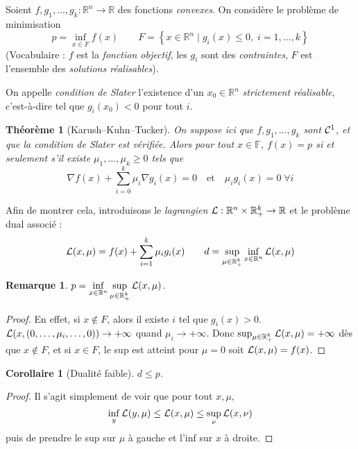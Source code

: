 \documentclass[a4paper, 11pt]{article}
\def\F{\mathbb{F}}
\def\R{\mathbb{R}}
\def\L{{\cal{L}}}
\def\Cf{{\cal{C}}}
\newtheorem*{theorem}{Théorème}
\newtheorem*{remark}{Remarque}
\newtheorem*{corollary}{Corollaire}
\begin{document}
Soient $f,g_1,\ldots,g_k : \R^n \to \R$ des fonctions \emph{convexes}.
On considère le problème de minimisation
\[ p = \inf_{x \in F} f(x) \qquad F = \left\{ x \in \R^n \mid
  g_i(x) \leq 0,\; i = 1,\ldots,k \right\} \]
(Vocabulaire : $f$ est la \emph{fonction objectif}, les $g_i$ sont des
\emph{contraintes}, $F$ est l'ensemble des \emph{solutions réalisables}).

On appelle \emph{condition de Slater} l'existence d'un $x_0 \in \R^n$
\emph{strictement réalisable}, c'est-à-dire tel que $g_i(x_0) < 0$ pour tout
$i$.

\begin{theorem}[Karush--Kuhn--Tucker]
  On suppose ici que $f, g_1, \ldots, g_k$ sont $\Cf^1$, et que la condition de
  Slater est vérifiée. Alors pour tout $x \in \F$, $f(x) = p$ si et seulement
  s'il existe $\mu_1, \ldots, \mu_k \geq 0$ tels que
  \[ \nabla f(x) + \sum_{i=0}^k \mu_i \nabla g_i(x) = 0 \quad \text{et} \quad
    \mu_i g_i(x) = 0\; \forall i
  \]
\end{theorem}

Afin de montrer cela, introduisons le \emph{lagrangien} $\L : \R^n \times
\R_+^k \to \R$ et le problème dual associé :
\[ \L(x, \mu) = f(x) + \sum_{i=1}^k \mu_i g_i(x) \qquad
  d = \sup_{\mu \in \R_+^k} \inf_{x \in \R^n} \L(x,\mu) \]

\begin{remark} $\displaystyle p = \inf_{x \in \R^n} \sup_{\mu \in \R_+^k}
  \L(x,\mu)$.
\end{remark}
\begin{proof}
  En effet, si $x \not\in F$, alors il existe $i$ tel que $g_i(x) > 0$.
  $\L(x,(0, \ldots, \mu_i, \ldots, 0)) \to +\infty$ quand $\mu_i \to
  +\infty$. Donc $\sup_{\mu \in \R_+^k} \L(x,\mu) = +\infty$ dès que $x \not\in
  F$, et si $x \in F$, le sup est atteint pour $\mu = 0$ soit $\L(x,\mu) =
  f(x)$.
\end{proof}
\begin{corollary}[Dualité faible]
  $d \leq p$.
\end{corollary}
\begin{proof}
  Il s'agit simplement de voir que pour tout $x, \mu$,
  \[ \inf_{y} \L(y, \mu) \leq \L(x,\mu) \leq \sup_{\nu} \L(x,\nu) \]
  puis de prendre le sup sur $\mu$ à gauche et l'inf sur $x$ à droite.
\end{proof}
\end{document}
